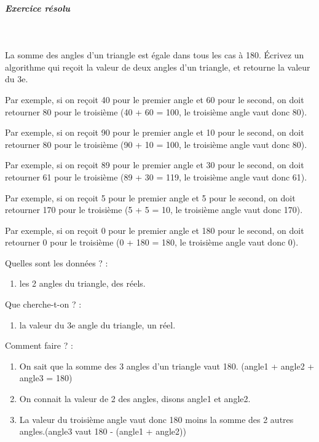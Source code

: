 \documentclass[11pt,a4paper]{article}
\begin{document}
			
		\subparagraph{Exercice r\'esolu} 
		
					\textcolor{white}{.} \par
				
          La somme des angles d'un triangle est \'egale dans tous les cas \`a 180\textdegree . \'Ecrivez un algorithme qui re\c coit la valeur de deux angles d'un triangle, et retourne la valeur du 3e. 
        
            \par
        Par exemple, si on re\c coit 40 pour le premier angle et 60 pour le second, on doit retourner 80 pour le troisi\`eme (40 + 60 = 100, le troisi\`eme angle vaut donc 80).
            \par
        Par exemple, si on re\c coit 90 pour le premier angle et 10 pour le second, on doit retourner 80 pour le troisi\`eme (90 + 10 = 100, le troisi\`eme angle vaut donc 80).
            \par
        Par exemple, si on re\c coit 89 pour le premier angle et 30 pour le second, on doit retourner 61 pour le troisi\`eme (89 + 30 = 119, le troisi\`eme angle vaut donc 61).
            \par
        Par exemple, si on re\c coit 5 pour le premier angle et 5 pour le second, on doit retourner 170 pour le troisi\`eme (5 + 5 = 10, le troisi\`eme angle vaut donc 170).
            \par
        Par exemple, si on re\c coit 0 pour le premier angle et 180 pour le second, on doit retourner 0 pour le troisi\`eme (0 + 180 = 180, le troisi\`eme angle vaut donc 0).
            \par
        
          Quelles sont les donn\'ees ? :
          
					\begin{enumerate}
				
			\item les 2 angles du triangle, des r\'eels.
					\end{enumerate}
				
          Que cherche-t-on ? :
          
					\begin{enumerate}
				
			\item la valeur du 3e angle du triangle, un r\'eel.
					\end{enumerate}
				
          Comment faire ? :
          
					\begin{enumerate}
				
			\item On sait que la somme des 3 angles d'un triangle vaut 180\textdegree . (angle1 + angle2 + angle3 = 180)
			\item On connait la valeur de 2 des angles, disons angle1 et angle2.
			\item La valeur du troisi\`eme angle vaut donc 180 moins la somme des 2 autres angles.(angle3 vaut 180 - (angle1 + angle2))
					\end{enumerate}
				
\end{document}
